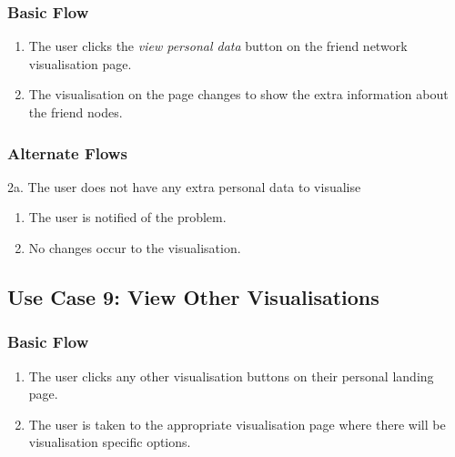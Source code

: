 \documentclass[12pt,onecolumn]{article}
\begin{document}
		\subsubsection{Basic Flow}

		\begin{enumerate}
			\item The user clicks the \emph{view personal data} button on the friend network visualisation page.

			\item The visualisation on the page changes to show the extra information about the friend nodes. 	

		\end{enumerate}

		\subsubsection{Alternate Flows}

		2a. The user does not have any extra personal data to visualise

		\begin{enumerate}
			\item The user is notified of the problem.

			\item No changes occur to the visualisation.

		\end{enumerate}	

	\subsection{Use Case 9: View Other Visualisations}

		\subsubsection{Basic Flow}

		\begin{enumerate}
			\item The user clicks any other visualisation buttons on their personal landing page.

			\item The user is taken to the appropriate visualisation page where there will be visualisation specific options. 	

		\end{enumerate}
	
	
		
\end{document}
